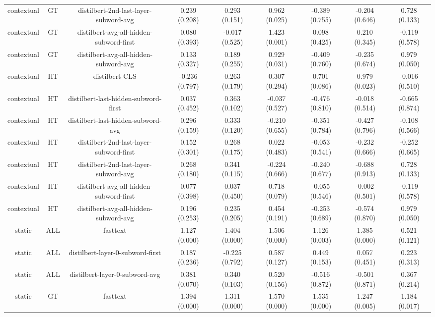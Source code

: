 \begin{sidewaystable}[htb]
\begin{tabular}{@{}ccccccccc@{}}
        contextual & GT & distilbert-2nd-last-layer-subword-avg & 0.239 (0.208) & 0.293 (0.151) & 0.962 (0.025) & -0.389 (0.755) & -0.204 (0.646) & 0.728 (0.133) \\
        contextual & GT & distilbert-avg-all-hidden-subword-first & 0.080 (0.393) & -0.017 (0.525) & 1.423 (0.001) & 0.098 (0.425) & 0.210 (0.345) & -0.119 (0.578) \\
        contextual & GT & distilbert-avg-all-hidden-subword-avg & 0.133 (0.327) & 0.189 (0.255) & 0.929 (0.031) & -0.409 (0.760) & -0.235 (0.674) & 0.979 (0.050) \\
        contextual & HT & distilbert-CLS & -0.236 (0.797) & 0.263 (0.179) & 0.307 (0.294) & 0.701 (0.086) & 0.979 (0.023) & -0.016 (0.510) \\
        contextual & HT & distilbert-last-hidden-subword-first & 0.037 (0.452) & 0.363 (0.102) & -0.037 (0.527) & -0.476 (0.810) & -0.018 (0.514) & -0.665 (0.874) \\
        contextual & HT & distilbert-last-hidden-subword-avg & 0.296 (0.159) & 0.333 (0.120) & -0.210 (0.655) & -0.351 (0.784) & -0.427 (0.796) & -0.108 (0.566) \\
        contextual & HT & distilbert-2nd-last-layer-subword-first & 0.152 (0.301) & 0.268 (0.175) & 0.022 (0.483) & -0.053 (0.541) & -0.232 (0.666) & -0.252 (0.665) \\
        contextual & HT & distilbert-2nd-last-layer-subword-avg & 0.268 (0.180) & 0.341 (0.115) & -0.224 (0.666) & -0.240 (0.677) & -0.688 (0.913) & 0.728 (0.133) \\
        contextual & HT & distilbert-avg-all-hidden-subword-first & 0.077 (0.398) & 0.037 (0.450) & 0.718 (0.079) & -0.055 (0.546) & -0.002 (0.501) & -0.119 (0.578) \\
        contextual & HT & distilbert-avg-all-hidden-subword-avg & 0.196 (0.253) & 0.235 (0.205) & 0.454 (0.191) & -0.253 (0.689) & -0.574 (0.870) & 0.979 (0.050) \\
        static & ALL & fasttext & 1.127 (0.000) & 1.404 (0.000) & 1.506 (0.000) & 1.126 (0.003) & 1.385 (0.000) & 0.521 (0.121) \\
        static & ALL & distilbert-layer-0-subword-first & 0.187 (0.236) & -0.225 (0.792) & 0.587 (0.127) & 0.449 (0.153) & 0.057 (0.451) & 0.223 (0.313) \\
        static & ALL & distilbert-layer-0-subword-avg & 0.381 (0.070) & 0.340 (0.103) & 0.520 (0.156) & -0.516 (0.872) & -0.501 (0.871) & 0.367 (0.214) \\
        static & GT & fasttext & 1.394 (0.000) & 1.311 (0.000) & 1.570 (0.000) & 1.535 (0.000) & 1.247 (0.005) & 1.184 (0.017) \\

\end{tabular}
\end{sidewaystable}
